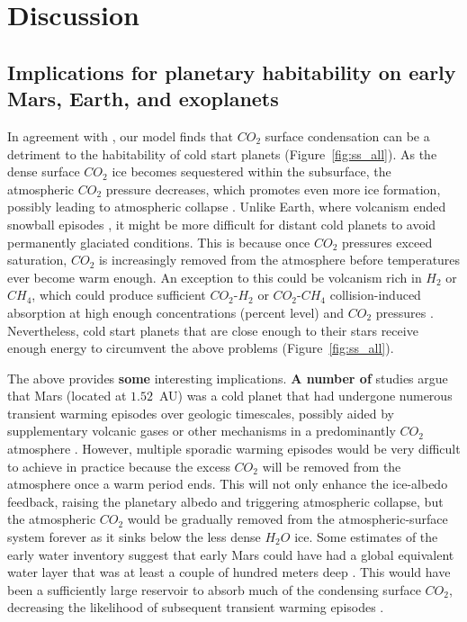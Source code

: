 \documentclass[fleqn,usenatbib]{mnras}
\providecommand{\DIFadd}[1]{{\bf #1}} %
\providecommand{\DIFdel}[1]{} %
\providecommand{\DIFaddbegin}{} %
\providecommand{\DIFaddend}{} %
\providecommand{\DIFdelbegin}{} %
\providecommand{\DIFdelend}{} %
\newcommand{\DIFscaledelfig}{0.5}
\newlength{\DIFdelgraphicswidth} %
\newlength{\DIFdelgraphicsheight} %
\newcommand{\DIFaddincludegraphics}[2][]{{\color{blue}\fbox{\DIFOincludegraphics[#1]{#2}}}} %
\newcommand{\DIFdelincludegraphics}[2][]{%
\sbox{\DIFdelgraphicsbox}{\DIFOincludegraphics[#1]{#2}}%
\settoboxwidth{\DIFdelgraphicswidth}{\DIFdelgraphicsbox} %
\settoboxtotalheight{\DIFdelgraphicsheight}{\DIFdelgraphicsbox} %
\scalebox{\DIFscaledelfig}{%
\parbox[b]{\DIFdelgraphicswidth}{\usebox{\DIFdelgraphicsbox}\\[-\baselineskip] \rule{\DIFdelgraphicswidth}{0em}}\llap{\resizebox{\DIFdelgraphicswidth}{\DIFdelgraphicsheight}{%
\setlength{\unitlength}{\DIFdelgraphicswidth}%
\begin{picture}(1,1)%
\thicklines\linethickness{2pt} %
{\color[rgb]{1,0,0}\put(0,0){\framebox(1,1){}}}%
{\color[rgb]{1,0,0}\put(0,0){\line( 1,1){1}}}%
{\color[rgb]{1,0,0}\put(0,1){\line(1,-1){1}}}%
\end{picture}%
}\hspace*{3pt}}} %
} %
\DeclareRobustCommand{\DIFaddbegin}{\DIFOaddbegin \let\includegraphics\DIFaddincludegraphics} %
\DeclareRobustCommand{\DIFaddend}{\DIFOaddend \let\includegraphics\DIFOincludegraphics} %
\DeclareRobustCommand{\DIFdelbegin}{\DIFOdelbegin \let\includegraphics\DIFdelincludegraphics} %
\DeclareRobustCommand{\DIFdelend}{\DIFOaddend \let\includegraphics\DIFOincludegraphics} %
\begin{document}
\section{Discussion}

\subsection{Implications for planetary habitability on early Mars, Earth, and exoplanets}

In agreement with \citet{Turbet2017}, our model finds that $CO_{\mathrm{2}}$ surface condensation can be a detriment to the habitability of cold start planets (Figure~\ref{fig:ss_all}). As the dense surface $CO_{\mathrm{2}}$ ice becomes sequestered within the subsurface, the atmospheric $CO_{\mathrm{2}}$ pressure decreases, which promotes even more ice formation, possibly leading to atmospheric collapse \citep{Turbet2017}. Unlike Earth, where volcanism ended snowball episodes \citep{Hoffman1342}, it might be more difficult for distant cold planets to avoid permanently glaciated conditions. This is because once $CO_{\mathrm{2}}$ pressures exceed saturation, $CO_{\mathrm{2}}$ is increasingly removed from the atmosphere before temperatures ever become warm enough. An exception to this could be volcanism rich in $H_{\mathrm{2}}$ or $CH_{\mathrm{4}}$, which could produce sufficient $CO_{\mathrm{2}}$-$H_{\mathrm{2}}$ or $CO_{\mathrm{2}}$-$CH_{\mathrm{4}}$ collision-induced absorption at high enough concentrations (percent level) and $CO_{\mathrm{2}}$ pressures \citep{ramirez2014,wordsworth_transient_2017,ramirez2017,ramirezkalt2018,turbet_far_2019}. Nevertheless, cold start planets that are close enough to their stars receive enough energy to circumvent the above problems (Figure~\ref{fig:ss_all}). 

The above provides \DIFdelbegin \DIFdel{a couple of }\DIFdelend \DIFaddbegin \DIFadd{some }\DIFaddend interesting implications. \DIFdelbegin \DIFdel{Some }\DIFdelend \DIFaddbegin \DIFadd{A number of }\DIFaddend studies argue that Mars (located at $1.52$~AU) was a cold planet that had undergone numerous transient warming episodes over geologic timescales, possibly aided by supplementary volcanic gases or other mechanisms in a predominantly $CO_{\mathrm{2}}$ atmosphere \citep{wordsworth2013,batalha2016,wordsworth_transient_2017,kite_methane_2020,hayworth_warming_2020}. However, multiple sporadic warming episodes would be very difficult to achieve in practice because the excess $CO_{\mathrm{2}}$ will be removed from the atmosphere once a warm period ends. This will not only enhance the ice-albedo feedback, raising the planetary albedo and triggering atmospheric collapse, but the atmospheric $CO_{\mathrm{2}}$ would be gradually removed from the atmospheric-surface system forever as it sinks below the less dense $H_{\mathrm{2}}O$ ice. Some estimates of the early water inventory suggest that early Mars could have had a global equivalent water layer that was at least a couple of hundred meters deep \citep{villanueva2015,ramirezetal2020}. This would have been a sufficiently large reservoir to absorb much of the condensing surface $CO_{\mathrm{2}}$, decreasing the likelihood of subsequent transient warming episodes \citep{Turbet2017}. 
\end{document}
